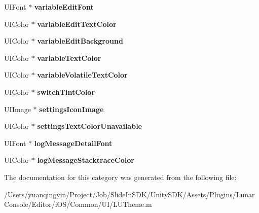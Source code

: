 \begin{DoxyCompactItemize}
U\+I\+Font $\ast$ {\bfseries variable\+Edit\+Font}
\item 
\mbox{\label{category_l_u_theme_07_08_ade1096ee453924d165d10540c036fb49}} 
U\+I\+Color $\ast$ {\bfseries variable\+Edit\+Text\+Color}
\item 
\mbox{\label{category_l_u_theme_07_08_a5aeb8c8e120b4830950fc3c7d77454a8}} 
U\+I\+Color $\ast$ {\bfseries variable\+Edit\+Background}
\item 
\mbox{\label{category_l_u_theme_07_08_a8e0e0ab8f11fe710c387d4d5e6287ac2}} 
U\+I\+Color $\ast$ {\bfseries variable\+Text\+Color}
\item 
\mbox{\label{category_l_u_theme_07_08_ad223d232452eedfc2e92319f1b313aa2}} 
U\+I\+Color $\ast$ {\bfseries variable\+Volatile\+Text\+Color}
\item 
\mbox{\label{category_l_u_theme_07_08_acd786be6b5a790037cf3a1d6bfad1baf}} 
U\+I\+Color $\ast$ {\bfseries switch\+Tint\+Color}
\item 
\mbox{\label{category_l_u_theme_07_08_ab6e2b15680234460e4b651609bc782c2}} 
U\+I\+Image $\ast$ {\bfseries settings\+Icon\+Image}
\item 
\mbox{\label{category_l_u_theme_07_08_a78b42d60d43ce71dcc7ab633edcff757}} 
U\+I\+Color $\ast$ {\bfseries settings\+Text\+Color\+Unavailable}
\item 
\mbox{\label{category_l_u_theme_07_08_a6dd0f92dc0b925d9909decf593dd9976}} 
U\+I\+Font $\ast$ {\bfseries log\+Message\+Detail\+Font}
\item 
\mbox{\label{category_l_u_theme_07_08_a4eecd6d0e25cf82c310de48fdfc22690}} 
U\+I\+Color $\ast$ {\bfseries log\+Message\+Stacktrace\+Color}
\end{DoxyCompactItemize}


The documentation for this category was generated from the following file\+:\begin{DoxyCompactItemize}
\item 
/\+Users/yuanqingyin/\+Project/\+Job/\+Slide\+In\+S\+D\+K/\+Unity\+S\+D\+K/\+Assets/\+Plugins/\+Lunar\+Console/\+Editor/i\+O\+S/\+Common/\+U\+I/L\+U\+Theme.\+m\end{DoxyCompactItemize}
